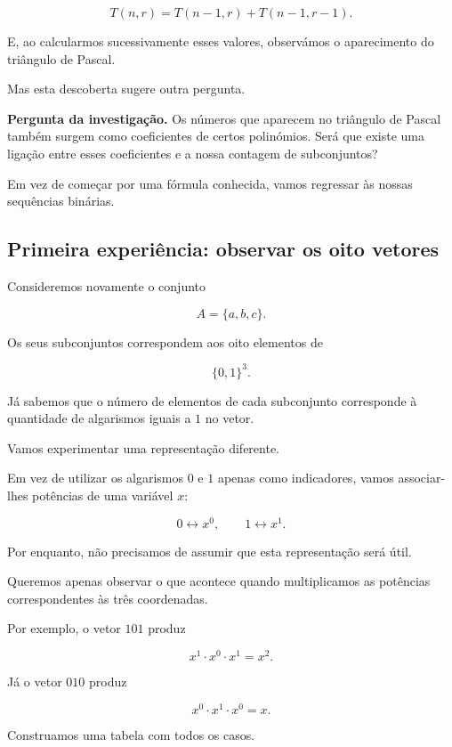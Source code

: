 \documentclass[11pt,a4paper,oneside]{book}
\newcommand{\Pergunta}[1]{\begin{perguntabox}\textbf{Pergunta da investigação.} #1\end{perguntabox}}
\begin{document}
\[
T(n,r)=T(n-1,r)+T(n-1,r-1).
\]

E, ao calcularmos sucessivamente esses valores,
observámos o aparecimento do triângulo de Pascal.

Mas esta descoberta sugere outra pergunta.

\Pergunta{Os números que aparecem no triângulo de
Pascal também surgem como coeficientes de certos
polinómios. Será que existe uma ligação entre
esses coeficientes e a nossa contagem de
subconjuntos?}

Em vez de começar por uma fórmula conhecida,
vamos regressar às nossas sequências binárias.

\subsection*{Primeira experiência: observar os oito vetores}

Consideremos novamente o conjunto

\[
A=\{a,b,c\}.
\]

Os seus subconjuntos correspondem aos oito
elementos de

\[
\{0,1\}^3.
\]

Já sabemos que o número de elementos de cada
subconjunto corresponde à quantidade de
algarismos iguais a $1$ no vetor.

Vamos experimentar uma representação diferente.

Em vez de utilizar os algarismos $0$ e $1$
apenas como indicadores, vamos associar-lhes
potências de uma variável $x$:

\[
0\longleftrightarrow x^0,
\qquad
1\longleftrightarrow x^1.
\]

Por enquanto, não precisamos de assumir que
esta representação será útil.

Queremos apenas observar o que acontece
quando multiplicamos as potências
correspondentes às três coordenadas.

Por exemplo, o vetor $101$ produz

\[
x^1\cdot x^0\cdot x^1=x^2.
\]

Já o vetor $010$ produz

\[
x^0\cdot x^1\cdot x^0=x.
\]

Construamos uma tabela com todos os casos.
\end{document}
